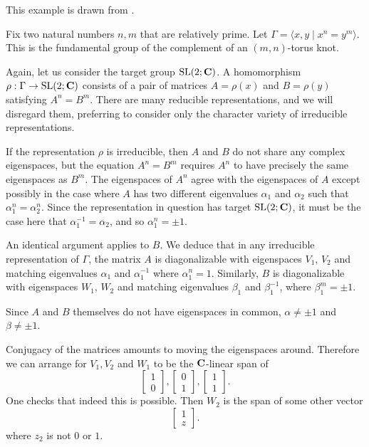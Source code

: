 \documentclass[11pt, oneside, usenames, dvipsnames, svgnames, table, final]{amsart}
\begin{document}
\begin{example}
  This example is drawn from \cite{Munoz2009}.
  
  Fix two natural numbers $n,m$ that are relatively prime. Let $\Gamma = \langle x,y \mid x^n = y^m \rangle$. This is
  the fundamental group of the complement of an $(m,n)$-torus knot.

  Again, let us consider the target group $\operatorname{SL}(2; \mathbf{C})$. A homomorphism $\rho: \Gamma \to \operatorname{SL}(2; \mathbf{C})$ consists of a
  pair of matrices $A=\rho(x)$ and $B=\rho(y)$ satisfying $A^n = B^m$. There are many reducible representations, and we
  will disregard them, preferring to consider only the character variety of irreducible representations.


  If the representation $\rho$ is irreducible, then $A$ and $B$ do not share any complex eigenspaces, but the equation
  $A^n=B^m$ requires $A^n$ to have precisely the same eigenspaces as $B^m$. The eigenspaces of $A^n$ agree with the
  eigenspaces of $A$ except possibly in the case where $A$ has two different eigenvalues $\alpha_1$ and $\alpha_2$ such
  that $\alpha_1^n = \alpha_2^n$. Since the representation in question has target $\operatorname{SL}(2; \mathbf{C})$, it must be the case
  here that $\alpha_1^{-1} = \alpha_2$, and so $\alpha_1^n = \pm 1$.

  An identical argument applies to $B$. We deduce that in any irreducible representation of $\Gamma$, the matrix $A$ is
  diagonalizable with eigenspaces $V_1$, $V_2$ and matching eigenvalues $\alpha_1$ and $\alpha_1^{-1}$ where $\alpha_1^n
  = 1$. Similarly, $B$ is diagonalizable with eigenspaces $W_1$, $W_2$ and matching eigenvalues $\beta_1$ and
  $\beta_1^{-1}$, where $\beta_1^m = \pm 1$.

  Since $A$ and $B$ themselves do not have eigenspaces in common, $\alpha \neq \pm 1$ and $\beta \neq \pm 1$.

  Conjugacy of the matrices amounts to moving the eigenspaces around. Therefore we can arrange for $V_1, V_2$ and $W_1$
  to be the $\mathbf{C}$-linear span of
  \[
    \begin{bmatrix}
      1 \\ 0 
    \end{bmatrix},
    \begin{bmatrix}
      0 \\ 1 
    \end{bmatrix},
    \begin{bmatrix}
      1 \\ 1 
    \end{bmatrix}.
  \]
  One checks that indeed this is possible. Then $W_2$ is the span of some other vector
  \[
    \begin{bmatrix}
      1 \\ z
    \end{bmatrix}.
  \]
  where $z_2$ is not $0$ or $1$.


\end{example}
\end{document}
